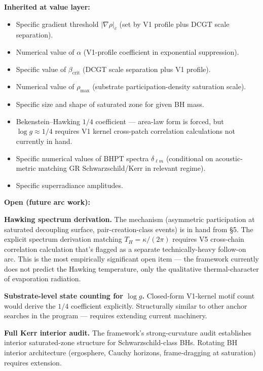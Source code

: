\documentclass[11pt,a4paper]{article}
\begin{document}
\textbf{Inherited at value layer:}

\begin{itemize}[noitemsep]
  \item Specific gradient threshold $|\nabla\rho|_c$ (set by V1 profile plus DCGT scale separation).
  \item Numerical value of $\alpha$ (V1-profile coefficient in exponential suppression).
  \item Specific value of $\beta_{\mathrm{crit}}$ (DCGT scale separation plus V1 profile).
  \item Numerical value of $\rho_{\mathrm{max}}$ (substrate participation-density saturation scale).
  \item Specific size and shape of saturated zone for given BH mass.
  \item Bekenstein--Hawking $1/4$ coefficient --- area-law form is forced, but $\log g \approx 1/4$ requires V1 kernel cross-patch correlation calculations not currently in hand.
  \item Specific numerical values of BHPT spectra $\delta_{\ell m}$ (conditional on acoustic-metric matching GR Schwarzschild/Kerr in relevant regime).
  \item Specific superradiance amplitudes.
\end{itemize}

\textbf{Open (future arc work):}

\textbf{Hawking spectrum derivation.} The mechanism (asymmetric participation at saturated decoupling surface, pair-creation-class events) is in hand from \S5. The explicit spectrum derivation matching $T_H = \kappa/(2\pi)$ requires V5 cross-chain correlation calculation that's flagged as a separate technically-heavy follow-on arc. This is the most empirically significant open item --- the framework currently does not predict the Hawking temperature, only the qualitative thermal-character of evaporation radiation.

\textbf{Substrate-level state counting for $\log g$.} Closed-form V1-kernel motif count would derive the $1/4$ coefficient explicitly. Structurally similar to other anchor searches in the program --- requires extending current machinery.

\textbf{Full Kerr interior audit.} The framework's strong-curvature audit establishes interior saturated-zone structure for Schwarzschild-class BHs. Rotating BH interior architecture (ergosphere, Cauchy horizons, frame-dragging at saturation) requires extension.
\end{document}
